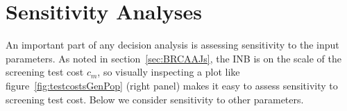 \documentclass[AMA,STIX1COL]{WileyNJD-v2}
\begin{document}



% 
% 




\section{Sensitivity Analyses}
\label{sec:SensAnaly}

An important part of any decision analysis is assessing sensitivity to the input parameters.  As noted in section~\ref{sec:BRCAAJs}, the INB is on the scale of the screening test cost $c_m$, so visually inspecting a plot like figure~\ref{fig:testcostsGenPop} (right panel) makes it easy to assess sensitivity to screening test cost.  Below we consider sensitivity to other parameters.
\end{document}
